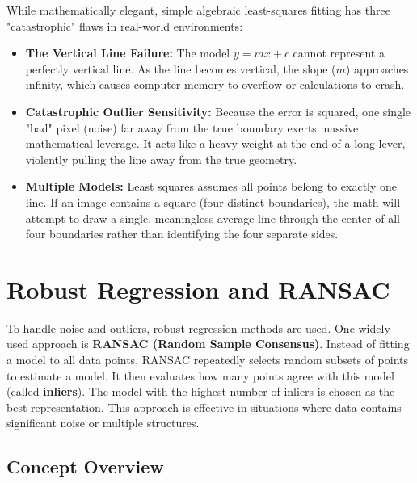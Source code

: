 \documentclass[12pt]{article}
\begin{document}
While mathematically elegant, simple algebraic least-squares fitting has three "catastrophic" flaws in real-world environments:

\begin{itemize}
    \item \textbf{The Vertical Line Failure:}
          The model $y = mx + c$ cannot represent a perfectly vertical line. As the line becomes vertical, the slope ($m$) approaches infinity, which causes computer memory to overflow or calculations to crash.

    \item \textbf{Catastrophic Outlier Sensitivity:}
          Because the error is squared, one single "bad" pixel (noise) far away from the true boundary exerts massive mathematical leverage. It acts like a heavy weight at the end of a long lever, violently pulling the line away from the true geometry.

    \item \textbf{Multiple Models:}
          Least squares assumes all points belong to exactly one line. If an image contains a square (four distinct boundaries), the math will attempt to draw a single, meaningless average line through the center of all four boundaries rather than identifying the four separate sides.
\end{itemize}


\section{Robust Regression and RANSAC}
To handle noise and outliers, robust regression methods are used. One widely used approach is \textbf{RANSAC (Random Sample Consensus)}. Instead of fitting a model to all data points, RANSAC repeatedly selects random subsets of points to estimate a model. It then evaluates how many points agree with this model (called \textbf{inliers}). The model with the highest number of inliers is chosen as the best representation. This approach is effective in situations where data contains significant noise or multiple structures.

\subsection{Concept Overview}
\end{document}
